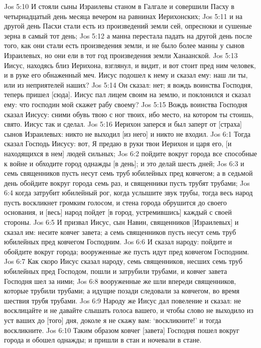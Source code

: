 Jos 5:10  И стояли сыны Израилевы станом в Галгале и совершили Пасху в четырнадцатый день месяца вечером на равнинах Иерихонских;
Jos 5:11  и на другой день Пасхи стали есть из произведений земли сей, опресноки и сушеные зерна в самый тот день;
Jos 5:12  а манна перестала падать на другой день после того, как они стали есть произведения земли, и не было более манны у сынов Израилевых, но они ели в тот год произведения земли Ханаанской.
Jos 5:13  Иисус, находясь близ Иерихона, взглянул, и видит, и вот стоит пред ним человек, и в руке его обнаженный меч. Иисус подошел к нему и сказал ему: наш ли ты, или из неприятелей наших?
Jos 5:14  Он сказал: нет; я вождь воинства Господня, теперь пришел [сюда]. Иисус пал лицем своим на землю, и поклонился и сказал ему: что господин мой скажет рабу своему?
Jos 5:15  Вождь воинства Господня сказал Иисусу: сними обувь твою с ног твоих, ибо место, на котором ты стоишь, свято. Иисус так и сделал.
Jos 5:16  Иерихон заперся и был заперт от [страха] сынов Израилевых: никто не выходил [из него] и никто не входил.
Jos 6:1  Тогда сказал Господь Иисусу: вот, Я предаю в руки твои Иерихон и царя его, [и находящихся в нем] людей сильных;
Jos 6:2  пойдите вокруг города все способные к войне и обходите город однажды [в день]; и это делай шесть дней;
Jos 6:3  и семь священников пусть несут семь труб юбилейных пред ковчегом; а в седьмой день обойдите вокруг города семь раз, и священники пусть трубят трубами;
Jos 6:4  когда затрубит юбилейный рог, когда услышите звук трубы, тогда весь народ пусть воскликнет громким голосом, и стена города обрушится до своего основания, и [весь] народ пойдет [в город, устремившись] каждый с своей стороны.
Jos 6:5  И призвал Иисус, сын Навин, священников [Израилевых] и сказал им: несите ковчег завета; а семь священников пусть несут семь труб юбилейных пред ковчегом Господним.
Jos 6:6  И сказал народу: пойдите и обойдите вокруг города; вооруженные же пусть идут пред ковчегом Господним.
Jos 6:7  Как скоро Иисус сказал народу, семь священников, несших семь труб юбилейных пред Господом, пошли и затрубили трубами, и ковчег завета Господня шел за ними;
Jos 6:8  вооруженные же шли впереди священников, которые трубили трубами; а идущие позади следовали за ковчегом, во время шествия трубя трубами.
Jos 6:9  Народу же Иисус дал повеление и сказал: не восклицайте и не давайте слышать голоса вашего, и чтобы слово не выходило из уст ваших до [того] дня, доколе я не скажу вам: `воскликните!' и тогда воскликните.
Jos 6:10  Таким образом ковчег [завета] Господня пошел вокруг города и обошел однажды; и пришли в стан и ночевали в стане.
